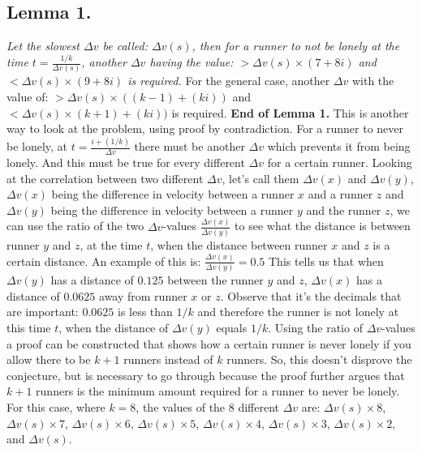 \documentclass[12pt, a4paper]{article}
\begin{document}
\subsection*{Lemma 1.}\textit{Let the slowest $\Delta v$ be called: $\Delta v(s)$, then for a runner to not be lonely at the time $t = \frac{1/k}{\Delta v(s)}$, another $\Delta v$ having the value: $> \Delta v(s)\times(7+8i)$ and $< \Delta v(s)\times(9+8i)$ is required.}
\newline
\newline
For the general case, another $\Delta v$ with the value of: $> \Delta v(s)\times((k-1)+(ki))$ and $< \Delta v(s)\times(k+1)+(ki))$ is required.
\newline
\newline
\textbf{End of Lemma 1.}
\newline
\newline
This is another way to look at the problem, using proof by contradiction. For a runner to never be lonely, at $t= \frac{i+(1/k)}{\Delta v}$ there must be another $\Delta v$ which prevents it from being lonely. And this must be true for every different $\Delta v$ for a certain runner.
Looking at the correlation between two different $\Delta v$, let's call them $\Delta v(x)$ and $\Delta v(y)$, $\Delta v(x)$ being the difference in velocity between a runner $x$ and a runner $z$ and $\Delta v(y)$ being the difference in velocity between a runner $y$ and the runner $z$, we can use the ratio of the two $\Delta v$-values $\frac{\Delta v(x)}{\Delta v(y)}$ to see what the distance is between runner $y$ and $z$, at the time $t$, when the distance between runner $x$ and $z$ is a certain distance. 
\newline
\newline
An example of this is: $\frac{\Delta v(x)}{\Delta v(y)} = 0.5$
This tells us that when $\Delta v(y)$ has a distance of $0.125$ between the runner $y$ and $z$, $\Delta v(x)$ has a distance of $0.0625$ away from runner $x$ or $z$. Observe that it's the decimals that are important: $0.0625$ is less than $1/k$ and therefore the runner is not lonely at this time $t$, when the distance of $\Delta v(y)$ equals $1/k$.
\newline
\newline
Using the ratio of $\Delta v$-values a proof can be constructed that shows how a certain runner is never lonely if you allow there to be $k+1$ runners instead of $k$ runners. So, this doesn't disprove the conjecture, but is necessary to go through because the proof further argues that $k+1$ runners is the minimum amount required for a runner to never be lonely. For this case, where $k=8$, the values of the $8$ different $\Delta v$ are: $\Delta v(s)\times8$, $\Delta v(s)\times7$, $\Delta v(s)\times6$, $\Delta v(s)\times5$, $\Delta v(s)\times4$, $\Delta v(s)\times3$, $\Delta v(s)\times2$, and $\Delta v(s)$.
\end{document}
